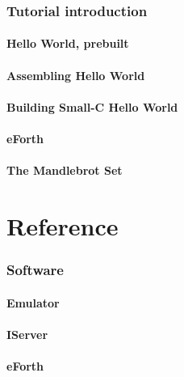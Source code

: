 \documentclass[a4paper]{tufte-book}
\begin{document}
\section{Tutorial introduction}
\label{tutorial-introduction}
\subsection{Hello World, prebuilt}
\subsection{Assembling Hello World}
\subsection{Building Small-C Hello World}
\subsection{eForth}
\subsection{The Mandlebrot Set}





\pagebreak




\pagebreak
\part{Reference}
\label{reference}

\section{Software}
\subsection{Emulator}
\subsection{IServer}
\subsection{eForth}
\end{document}
